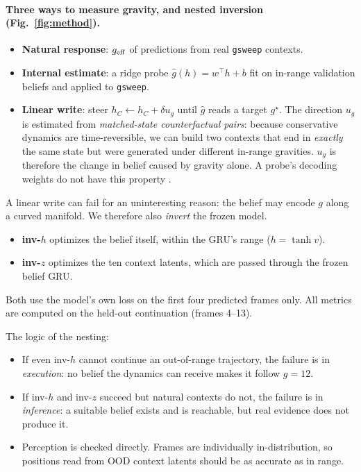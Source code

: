 \paragraph{Three ways to measure gravity, and nested inversion (Fig.~\ref{fig:method}).}
\begin{itemize}
\item \textbf{Natural response}: $g_{\rm eff}$ of predictions from real \texttt{gsweep} contexts.
\item \textbf{Internal estimate}: a ridge probe $\hat g(h)=w^\top h+b$ fit on in-range validation
beliefs and applied to \texttt{gsweep}.
\item \textbf{Linear write}: steer $h_C\leftarrow h_C+\delta u_g$ until $\hat g$ reads a target
$g^\star$. The direction $u_g$ is estimated from \emph{matched-state counterfactual pairs}: because
conservative dynamics are time-reversible, we can build two contexts that end in \emph{exactly}
the same state but were generated under different in-range gravities. $u_g$ is therefore the change
in belief caused by gravity alone. A probe's decoding weights do not have this property
\citep{haufe2014interpretation}.
\end{itemize}

A linear write can fail for an uninteresting reason: the belief may encode $g$ along a curved
manifold. We therefore also \emph{invert} the frozen model.
\begin{itemize}
\item \textbf{inv-$h$} optimizes the belief itself, within the GRU's range ($h=\tanh v$).
\item \textbf{inv-$z$} optimizes the ten context latents, which are passed through the frozen
belief GRU.
\end{itemize}
Both use the model's own loss on the first four predicted frames only. All metrics are computed on
the held-out continuation (frames 4--13).

The logic of the nesting:
\begin{itemize}
\item If even inv-$h$ cannot continue an out-of-range trajectory, the failure is in
\emph{execution}: no belief the dynamics can receive makes it follow $g{=}12$.
\item If inv-$h$ and inv-$z$ succeed but natural contexts do not, the failure is in
\emph{inference}: a suitable belief exists and is reachable, but real evidence does not produce it.
\item Perception is checked directly. Frames are individually in-distribution, so positions read
from OOD context latents should be as accurate as in range.
\end{itemize}


